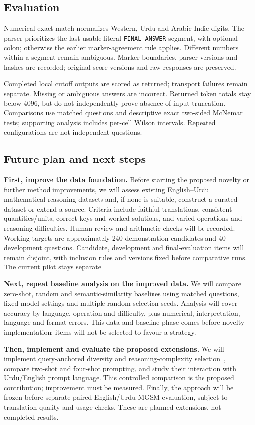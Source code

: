 \documentclass[conference]{IEEEtran}
\begin{document}
\subsection{Evaluation}
Numerical exact match normalizes Western, Urdu and Arabic-Indic digits. The parser prioritizes the last usable literal \texttt{FINAL\_ANSWER} segment, with optional colon; otherwise the earlier marker-agreement rule applies. Different numbers within a segment remain ambiguous. Marker boundaries, parser versions and hashes are recorded; original score versions and raw responses are preserved.

Completed local cutoff outputs are scored as returned; transport failures remain separate. Missing or ambiguous answers are incorrect. Returned token totals stay below 4096, but do not independently prove absence of input truncation. Comparisons use matched questions and descriptive exact two-sided McNemar tests; supporting analysis includes per-cell Wilson intervals. Repeated configurations are not independent questions.

\subsection{Future plan and next steps}
\textbf{First, improve the data foundation.} Before starting the proposed novelty or further method improvements, we will assess existing English--Urdu mathematical-reasoning datasets and, if none is suitable, construct a curated dataset or extend a source. Criteria include faithful translations, consistent quantities/units, correct keys and worked solutions, and varied operations and reasoning difficulties. Human review and arithmetic checks will be recorded. Working targets are approximately 240 demonstration candidates and 40 development questions. Candidate, development and final-evaluation items will remain disjoint, with inclusion rules and versions fixed before comparative runs. The current pilot stays separate.

\textbf{Next, repeat baseline analysis on the improved data.} We will compare zero-shot, random and semantic-similarity baselines using matched questions, fixed model settings and multiple random selection seeds. Analysis will cover accuracy by language, operation and difficulty, plus numerical, interpretation, language and format errors. This data-and-baseline phase comes before novelty implementation; items will not be selected to favour a strategy.

\textbf{Then, implement and evaluate the proposed extensions.} We will implement query-anchored diversity and reasoning-complexity selection~\cite{fu}, compare two-shot and four-shot prompting, and study their interaction with Urdu/English prompt language. This controlled comparison is the proposed contribution; improvement must be measured. Finally, the approach will be frozen before separate paired English/Urdu MGSM evaluation, subject to translation-quality and usage checks. These are planned extensions, not completed results.
\end{document}
